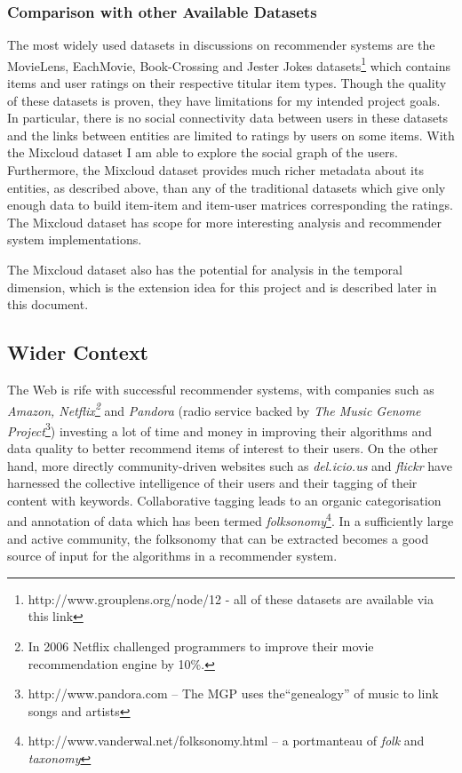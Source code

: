 \subsubsection*{Comparison with other Available Datasets}

The most widely used datasets in discussions on recommender systems are the MovieLens, EachMovie, Book-Crossing and Jester Jokes datasets\footnote{http://www.grouplens.org/node/12 - all of these datasets are available via this link} which contains items and user ratings on their respective titular item types. Though the quality of these datasets is proven, they have limitations for my intended project goals. In particular, there is no social connectivity data between users in these datasets and the links between entities are limited to ratings by users on some items. With the Mixcloud dataset I am able to explore the social graph of the users. Furthermore, the Mixcloud dataset provides much richer metadata about its entities, as described above, than any of the traditional datasets which give only enough data to build item-item and item-user matrices corresponding the ratings. The Mixcloud dataset has scope for more interesting analysis and recommender system implementations.

The Mixcloud dataset also has the potential for analysis in the temporal dimension, which is the extension idea for this project and is described later in this document.

\subsection*{Wider Context}

The Web is rife with successful recommender systems, with companies such as \textit{Amazon, Netflix\footnote{In 2006 Netflix challenged programmers to improve their movie recommendation engine by 10\%.}} and \textit{Pandora} (radio service backed by \textit{The Music Genome Project}\footnote{http://www.pandora.com -- The MGP uses the``genealogy'' of music to link songs and artists}) investing a lot of time and money in improving their algorithms and data quality to better recommend items of interest to their users. On the other hand, more directly community-driven websites such as \textit{del.icio.us} and \textit{flickr} have harnessed the collective intelligence of their users and their tagging of their content with keywords. Collaborative tagging leads to an organic categorisation and annotation of data which has been termed \textit{folksonomy}\footnote{http://www.vanderwal.net/folksonomy.html -- a portmanteau of \textit{folk} and \textit{taxonomy} }. In a sufficiently large and active community, the folksonomy that can be extracted becomes a good source of input for the algorithms in a recommender system. 

